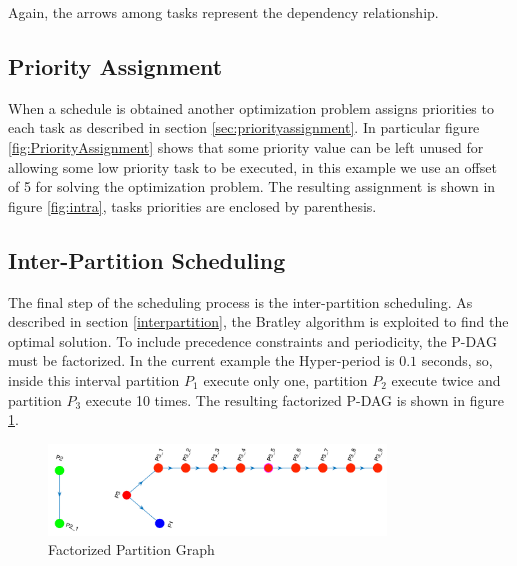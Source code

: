 Again, the arrows among tasks represent the dependency relationship.


\subsection{Priority Assignment}
When a schedule is obtained another optimization problem assigns priorities to each task as described in section \ref{sec:priorityassignment}. In particular figure \ref{fig:PriorityAssignment} shows that some priority value can be left unused for allowing some low priority task to be executed, in this example we use an offset of 5 for solving the optimization problem. The resulting assignment is shown in figure \ref{fig:intra}, tasks priorities are enclosed by parenthesis.

\subsection{Inter-Partition Scheduling}
The final step of the scheduling process is the inter-partition scheduling. As described in section \ref{interpartition}, the Bratley algorithm is exploited to find the optimal solution. To include precedence constraints and periodicity, the P-DAG must be factorized. In the current example the Hyper-period is $0.1$ seconds, so, inside this interval partition $P_1$ execute only one, partition $P_2$ execute twice and partition $P_3$ execute 10 times. The resulting factorized P-DAG is shown in figure \ref{fig:fPDAG}.
\begin{figure}[htbp] 
\centering    
\includegraphics[width=0.8\textwidth]{fPDAG}
\caption{Factorized Partition Graph}
\label{fig:fPDAG}
\end{figure}

